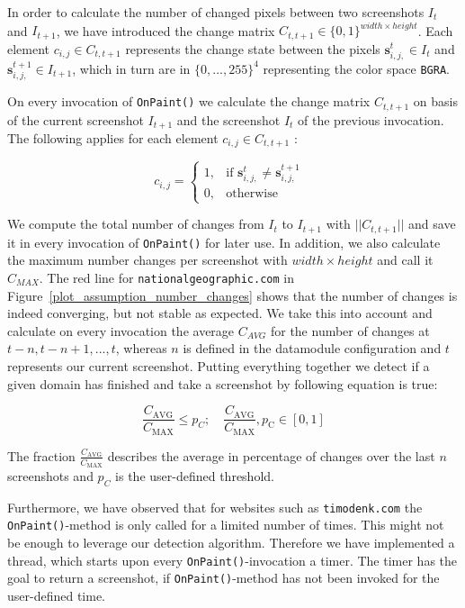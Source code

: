 In order to calculate the number of changed pixels between two screenshots $I_{t}$ and $I_{t+1}$, we have introduced the change matrix $C_{t,t+1} \in \{0,1\}^{width\times height}$. Each element $c_{i,j} \in C_{t,t+1}$ represents the change state between the pixels $\mathbf{s}^{t}_{i,j,} \in I_{t}$ and $\mathbf{s}^{t+1}_{i,j,}  \in I_{t+1}$, which in turn are in $\{0, ... , 255\}^{4}$ representing the color space \texttt{BGRA}.

On every invocation of \texttt{OnPaint()} we calculate the change matrix $C_{t,t+1}$ on basis of the current screenshot $I_{t+1}$ and the screenshot $I_{t}$ of the previous invocation. The following applies for each element $c_{i,j} \in C_{t,t+1}$ :

\[
c_{i,j} =
\begin{cases}
1,& \text{if $\mathbf{s}^{t}_{i,j,} \neq \mathbf{s}^{t+1}_{i,j,}$ } \\
0,              & \text{otherwise}
\end{cases}
\]

We compute the total number of changes from $I_{t}$ to $I_{t+1}$ with $|| C_{t,t+1}||$ and save it in every invocation of \texttt{OnPaint()} for later use. In addition, we also calculate the maximum number changes per screenshot with $width \times height$ and call it $C_{MAX}$. The red line for \texttt{nationalgeographic.com} in Figure~\ref{plot_assumption_number_changes} shows that the number of changes is indeed converging, but not stable as expected. We take this into account and calculate on every invocation the average $C_{AVG}$ for the number of changes at $t-n, t-n+1, ..., t$, whereas $n$ is defined in the datamodule configuration and $t$ represents our current screenshot. Putting everything together we detect if a given domain has finished and take a screenshot by following equation is true:

\[
{\frac{C_{\text{AVG}}}{C_{\text{MAX}}} \leq p_{C}; \quad   {\frac{C_{\text{AVG}}}{C_{\text{MAX}}}}, p_{\text{C}} \in [0,1]}
\]

The fraction ${\frac{C_{\text{AVG}}}{C_{\text{MAX}}}}$ describes the average in percentage of changes over the last $n$ screenshots and $p_{C}$ is the user-defined threshold. 

Furthermore, we have observed that for websites such as \texttt{timodenk.com} the \texttt{OnPaint()}-method is only called for a limited number of times. This might not be enough to leverage our detection algorithm. Therefore we have implemented a thread, which starts upon every \texttt{OnPaint()}-invocation a timer. The timer has the goal to return a screenshot, if \texttt{OnPaint()}-method has not been invoked for the user-defined time.  

